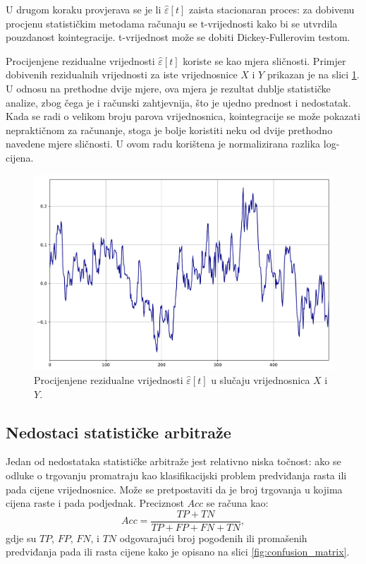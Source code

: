\documentclass[lmodern, utf8, diplomski, numeric]{fer}
\newcommand{\q}{\left}
\newcommand{\w}{\right}
\begin{document}
  U drugom koraku provjerava se je li $\hat{\varepsilon}\q[t\w]$ zaista stacionaran proces: za dobivenu procjenu statističkim metodama računaju se t-vrijednosti kako bi se utvrdila pouzdanost kointegracije.
  t-vrijednost može se dobiti Dickey-Fullerovim testom\citep{dickey-fuller}.
  
  Procijenjene rezidualne vrijednosti $\hat{\varepsilon}\q[t\w]$ koriste se kao mjera sličnosti.
  Primjer dobivenih rezidualnih vrijednosti za iste vrijednosnice $X$ i $Y$ prikazan je na slici \ref{fig:residual}.
  U odnosu na prethodne dvije mjere, ova mjera je rezultat dublje statističke analize, zbog čega je i računski zahtjevnija, što je ujedno prednost i nedostatak.
  Kada se radi o velikom broju parova vrijednosnica, kointegracije se može pokazati nepraktičnom za računanje, stoga je bolje koristiti neku od dvije prethodno navedene mjere sličnosti.
  U ovom radu korištena je normalizirana razlika log-cijena.
  
  \begin{figure}[H]
    \centering
    \includegraphics[width=1.0\linewidth]{graphics/residual.pdf}
    \caption{
      Procijenjene rezidualne vrijednosti $\hat{\varepsilon}\q[t\w]$ u slučaju vrijednosnica $X$ i $Y$.}
    \label{fig:residual}
  \end{figure}
  
  \subsection{Nedostaci statističke arbitraže}
  Jedan od nedostataka statističke arbitraže jest relativno niska točnost: ako se odluke o trgovanju promatraju kao klasifikacijski problem predviđanja rasta ili pada cijene vrijednosnice.
  Može se pretpostaviti da je broj trgovanja u kojima cijena raste i pada podjednak.
  Preciznost $\mathit{Acc}$ se računa kao:
  \begin{equation}
    \mathit{Acc} = \frac{\mathit{TP} + \mathit{TN}}{\mathit{TP} + \mathit{FP} + \mathit{FN} + \mathit{TN}},
  \end{equation}
  gdje su $\mathit{TP}$, $\mathit{FP}$, $\mathit{FN}$, i $\mathit{TN}$ odgovarajući broj pogođenih ili promašenih predviđanja pada ili rasta cijene kako je opisano na slici \ref{fig:confusion_matrix}.
  
\end{document}
